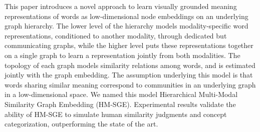 This paper introduces a novel approach to learn visually grounded meaning representations of words as low-dimensional node embeddings on an underlying graph hierarchy. The lower level of the hierarchy models modality-specific word representations, conditioned to another modality, through dedicated but communicating graphs, while the higher level puts these representations together on a single graph to learn a representation jointly from both modalities. The topology of each graph models similarity relations among words, and is estimated jointly with the graph embedding. The assumption underlying this model is that words sharing similar meaning correspond to communities in an underlying graph in a low-dimensional space. We named this model Hierarchical Multi-Modal Similarity Graph Embedding (HM-SGE). Experimental results validate the ability of HM-SGE to simulate human similarity judgments and concept categorization, outperforming the state of the art.
